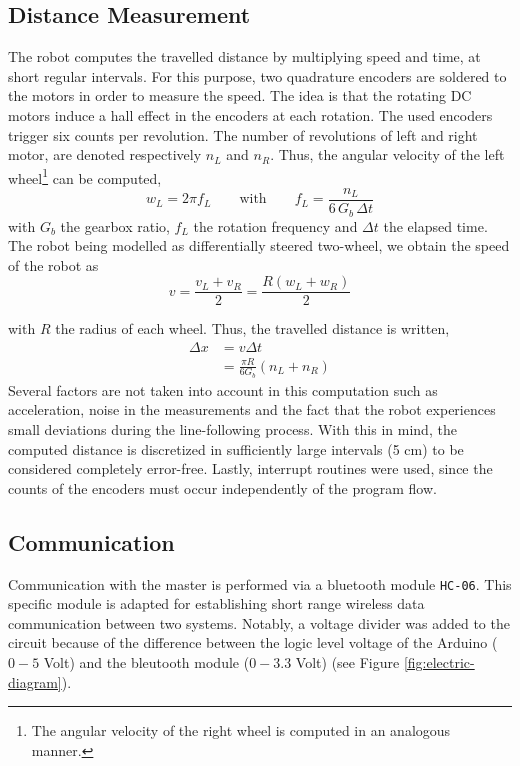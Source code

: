 \documentclass[12pt]{report}
\begin{document}
\subsection*{Distance Measurement}
The robot computes the travelled distance by multiplying speed and time, at short regular intervals. For this purpose, two quadrature encoders are soldered to the motors in order to measure the speed. The idea is that the rotating DC motors induce a hall effect in the encoders at each rotation. The used encoders trigger six counts per revolution. The number of revolutions of left and right motor, are denoted respectively $n_L$ and $n_R$. Thus, the angular velocity of the left wheel\footnote{The angular velocity of the right wheel is computed in an analogous manner.} can be computed,
\begin{equation}
w_L = 2\pi f_L
\qquad\text{with}\qquad	
f_L = \frac{n_L}{6\, G_b \, \Delta{t} }
\end{equation}
with $G_b$ the gearbox ratio, $f_L$ the rotation frequency and $\Delta{t}$ the elapsed time. The robot being modelled as differentially steered two-wheel, we obtain the speed of the robot as
\begin{equation}
v = \frac{v_L + v_R}{2} = \frac{R(w_L + w_R)}{2}
\end{equation}

with $R$ the radius of each wheel. Thus, the travelled distance is written,
\begin{align*}
\Delta{x} &= v\Delta{t}\\
&= \frac{\pi R}{6 G_b}(n_L + n_R)
\end{align*}
Several factors are not taken into account in this computation such as acceleration, noise in the measurements and the fact that the robot experiences small deviations during the line-following process. With this in mind, the computed distance is discretized in sufficiently large intervals (5 cm) to be considered completely error-free. Lastly, interrupt routines were used, since the counts of the encoders must occur independently of the program flow.

\subsection*{Communication}
Communication with the master is performed via a bluetooth module \texttt{HC-06}. This specific module is adapted for establishing short range wireless data communication between two systems. Notably, a voltage divider was added to the circuit because of the difference between the logic level voltage of the Arduino ($0-5$ Volt) and the bleutooth module ($0-3.3$ Volt) (see Figure \ref{fig:electric-diagram}).
\end{document}
